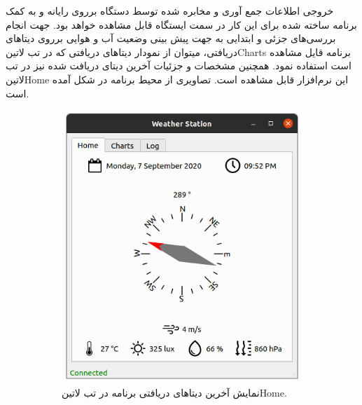 خروجی اطلاعات جمع آوری و مخابره شده توسط دستگاه برروی رایانه و به کمک برنامه ساخته شده برای این کار در سمت ایستگاه قابل مشاهده خواهد بود. جهت انجام بررسی‌های جزئی و ابتدایی به جهت پیش بینی وضعیت آب و هوایی برروی دیتا‌های دریافتی، میتوان از نمودار‌ دیتا‌های دریافتی که در تب ‌لاتین{Charts} برنامه قایل مشاهده است استفاده نمود. همچنین مشخصات و جزئیات آخرین دیتای دریافت شده نیز در تب ‌لاتین{Home} این نرم‌افزار قابل مشاهده است. تصاویری از محیط برنامه در  شکل  آمده است.

\begin{figure}[!h]
	\begin{subfigure}[b]{0.5\textwidth}
		\includegraphics[width=\linewidth]{Assets/desktopAppHome.png}
		\caption{نمایش آخرین دیتا‌های دریافتی برنامه در تب ‌لاتین{Home}.}
		\label{fig:desktopAppHome}
	\end{subfigure}
	\begin{subfigure}[b]{0.5\textwidth}

\end{subfigure}
\end{figure}
